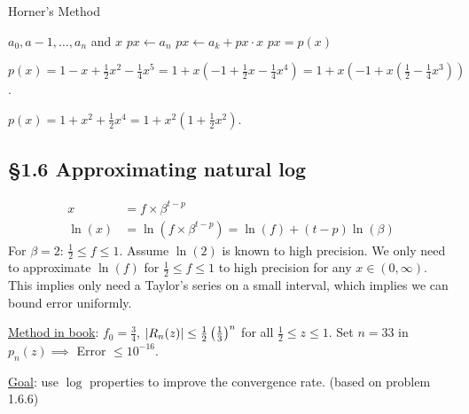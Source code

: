 \documentclass[]{article}
\begin{document}
\begin{algorithm}
	\caption{Horner's Method}
	\begin{algorithmic}
		\Require $a_0,a-1,\dots,a_n$ and $x$
		\State $px\gets a_n$
		\State $px\gets a_k + px\cdot x$
		\EndFor
		\State\Return $px = p(x)$
	\end{algorithmic}
\end{algorithm}


\begin{example}
		$p(x) = 1-x+\frac12x^2-\frac14x^5 
			 = 1+x(-1+\frac12x-\frac14x^4) 
			 = 1+x(-1+x(\frac12-\frac14x^3)) $.
\end{example}
\begin{example}
		$p(x) = 1+x^2 + \frac12x^4 
			 = 1+x^2(1+\frac12x^2)$.
\end{example}

\subsection*{\S1.6 Approximating natural log}

\begin{align*}
	x &= f\times \beta^{t-p} \\
	\ln(x) &= \ln(f\times\beta^{t-p})
		   = \ln(f) + (t-p)\ln(\beta)
\end{align*}
For $\beta=2$: $\frac12\leq f\leq 1$.
Assume $\ln(2)$ is known to high precision.
We only need to approximate $\ln(f)$ for $\frac12\leq f\leq 1$ to high precision for any $x\in(0,\infty)$.
This implies only need a Taylor's series on a small interval, which implies we can bound error uniformly.

\ul{Method in book}: $f_0 = \frac34$, $|R_n(z)|\leq\frac12\left(\frac13\right)^n$ for all $\frac12\leq z\leq 1$.
Set $n=33$ in $p_n(z) \implies$ Error $\leq10^{-16}$.

\ul{Goal}: use $\log$ properties to improve the convergence rate. (based on problem 1.6.6)
\end{document}
